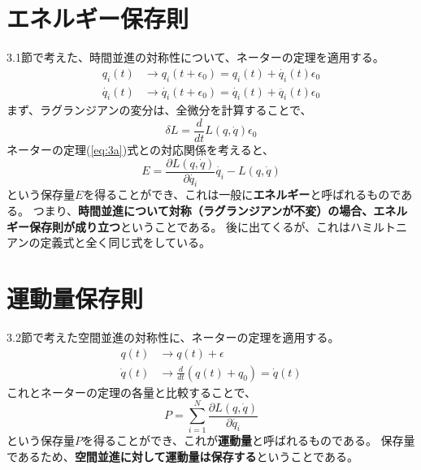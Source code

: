 \documentclass[a4paper]{jsreport}
\begin{document}
        \section{エネルギー保存則}
            3.1節で考えた、時間並進の対称性について、ネーターの定理を適用する。
            \begin{align}
                q_i(t) &\to q_i(t + \epsilon_0) = q_i(t) + \dot{q_i}(t)\epsilon_0 \\
                \dot{q_i}(t) &\to \dot{q_i}(t + \epsilon_0) = \dot{q_i}(t) + \ddot{q_i}(t)\epsilon_0
            \end{align}
            まず、ラグランジアンの変分は、全微分を計算することで、
            \begin{equation}
                \delta L = \frac{d}{dt} L(q, \dot{q})\epsilon_0
            \end{equation}
            ネーターの定理(\ref{eq:3a})式との対応関係を考えると、
            \begin{equation} \label{eq:3b}
                E = \frac{\partial L(q, \dot{q})}{\partial \dot{q_i}} \dot{q_i} - L(q, \dot{q})
            \end{equation}
            という保存量$E$を得ることができ、これは一般に\textbf{エネルギー}と呼ばれるものである。
            つまり、\textbf{時間並進について対称（ラグランジアンが不変）の場合、エネルギー保存則が成り立つ}ということである。
            後に出てくるが、これはハミルトニアンの定義式と全く同じ式をしている。

        \section{運動量保存則}
            3.2節で考えた空間並進の対称性に、ネーターの定理を適用する。
            \begin{align}
                q(t) &\to q(t) + \epsilon \\
                \dot{q}(t) &\to \frac{d}{dt} ({q(t)} + q_0) = \dot{q}(t)
            \end{align}
            これとネーターの定理の各量と比較することで、
            \begin{equation}
                P = \sum_{i=1}^{N} \frac{\partial L(q, \dot{q})}{\partial \dot{q_i}}
            \end{equation}
            という保存量$P$を得ることができ、これが\textbf{運動量}と呼ばれるものである。
            保存量であるため、\textbf{空間並進に対して運動量は保存する}ということである。
\end{document}
